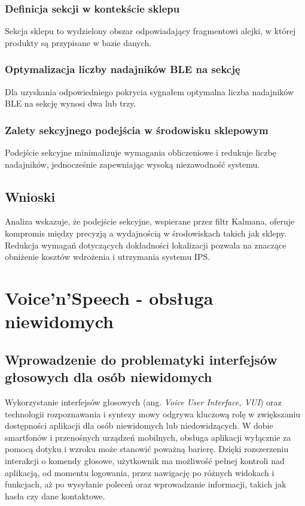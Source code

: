 \subsubsection{Definicja sekcji w kontekście sklepu}
Sekcja sklepu to wydzielony obszar odpowiadający fragmentowi alejki, w której produkty są przypisane w bazie danych.

\subsubsection{Optymalizacja liczby nadajników BLE na sekcję}
Dla uzyskania odpowiedniego pokrycia sygnałem optymalna liczba nadajników BLE na sekcję wynosi dwa lub trzy.

\subsubsection{Zalety sekcyjnego podejścia w środowisku sklepowym}
Podejście sekcyjne minimalizuje wymagania obliczeniowe i redukuje liczbę nadajników, jednocześnie zapewniając wysoką niezawodność systemu.

\subsection{Wnioski}
Analiza wskazuje, że podejście sekcyjne, wspierane przez filtr Kalmana, oferuje kompromis między precyzją a wydajnością w środowiskach takich jak sklepy. Redukcja wymagań dotyczących dokładności lokalizacji pozwala na znaczące obniżenie kosztów wdrożenia i utrzymania systemu IPS.

\section{Voice'n'Speech - obsługa niewidomych}
\subsection{Wprowadzenie do problematyki interfejsów głosowych dla osób niewidomych}

Wykorzystanie interfejsów głosowych (ang. \textit{Voice User Interface, VUI}) oraz technologii rozpoznawania i syntezy mowy odgrywa kluczową rolę w zwiększaniu dostępności aplikacji dla osób niewidomych lub niedowidzących. W dobie smartfonów i przenośnych urządzeń mobilnych, obsługa aplikacji wyłącznie za pomocą dotyku i wzroku może stanowić poważną barierę. Dzięki rozszerzeniu interakcji o komendy głosowe, użytkownik ma możliwość pełnej kontroli nad aplikacją, od momentu logowania, przez nawigację po różnych widokach i funkcjach, aż po wysyłanie poleceń oraz wprowadzanie informacji, takich jak hasła czy dane kontaktowe.

